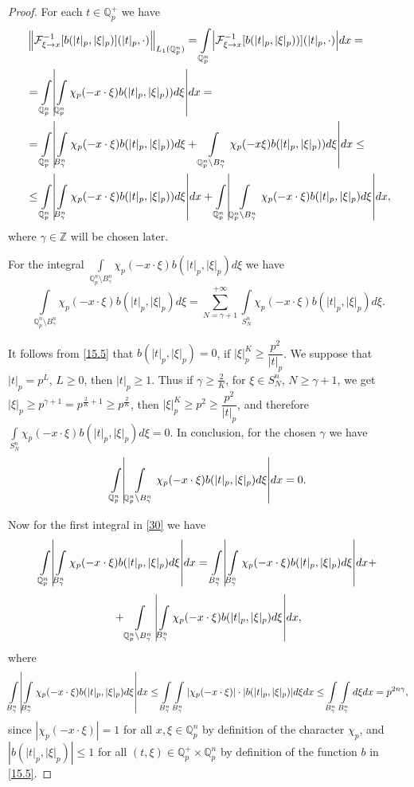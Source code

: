 \documentclass[14pt]{article}
\DeclarePairedDelimiter\abs{\lvert}{\rvert}
\newcommand{\norm}[1]{\left\lVert#1\right\rVert}
\theoremstyle{theorem}
\theoremstyle{theorem}
\theoremstyle{definition}
\theoremstyle{lemma}
\newcommand{\Label}[1]{\label{#1}}
\numberwithin{equation}{section}
\begin{document}
\begin{proof}
For each $t\in\mathbb{Q}_p^+$ we have
\begin{equation}\Label{30}
\begin{split}
&\norm{\mathcal{F}_{\xi\to x}^{-1}[b(|t|_p,|\xi|_p)](|t|_p,\cdot)}_{L_1(\mathbb{Q}_p^n)}=\int\limits_{\mathbb{Q}_p^n}\abs*{\mathcal{F}_{\xi\to x}^{-1}[b(|t|_p,|\xi|_p))](|t|_p,\cdot)}dx=\\
&=\int\limits_{\mathbb{Q}_p^n}\abs*{\int\limits_{\mathbb{Q}_p^n}\chi_p(-x\cdot\xi)b(|t|_p,|\xi|_p))d\xi}dx=\\
&=\int\limits_{\mathbb{Q}_p^n}\abs*{\int\limits_{B_{\gamma}^n}\chi_p(-x\cdot\xi)b(|t|_p,|\xi|_p))d\xi+\int\limits_{\mathbb{Q}_p^n\setminus B_{\gamma}^n}\chi_p(-x\xi)b(|t|_p,|\xi|_p))d\xi}dx\leq\\
&\leq\int\limits_{\mathbb{Q}_p^n}\abs*{\int\limits_{B_{\gamma}^n}\chi_p(-x\cdot\xi)b(|t|_p,|\xi|_p))d\xi}dx+\int\limits_{\mathbb{Q}_p^n}\abs*{\int\limits_{\mathbb{Q}_p^n\setminus B_{\gamma}^n}\chi_p(-x\cdot\xi)b(|t|_p,|\xi|_p)d\xi}dx,
\end{split}
\end{equation}
where $\gamma\in\mathbb{Z}$ will be chosen later.

For the integral $\int\limits_{\mathbb{Q}_p^n\setminus B_{\gamma}^n}\chi_p(-x\cdot\xi)b(|t|_p,|\xi|_p)d\xi$ we have
$$\int\limits_{\mathbb{Q}_p^n\setminus B_{\gamma}^n}\chi_p(-x\cdot\xi)b(|t|_p,|\xi|_p)d\xi=\sum\limits_{N=\gamma+1}^{+\infty}\int\limits_{S_N^n}\chi_p(-x\cdot\xi)b(|t|_p,|\xi|_p)d\xi.$$

It follows from \eqref{15.5} that $b(|t|_p,|\xi|_p)=0$, if $|\xi|_p^K\geq\dfrac{p^2}{|t|_p}$. We suppose that $|t|_p=p^L$, $L\geq0$, then $|t|_p\geq1$. Thus if $\gamma\geq\frac{2}{K}$, for $\xi\in S_N^n$, $N\geq\gamma+1$, we get $|\xi|_p\geq p^{\gamma+1}=p^{\frac{2}{K}+1}\geq p^{\frac{2}{K}}$, then $|\xi|_p^K\geq p^2\geq\dfrac{p^2}{|t|_p}$, and therefore $\int\limits_{S_N^n}\chi_p(-x\cdot\xi)b(|t|_p,|\xi|_p)d\xi=0$. In conclusion, for the chosen $\gamma$ we have
$$\int\limits_{\mathbb{Q}_p^n}\abs*{\int\limits_{\mathbb{Q}_p^n\setminus B_{\gamma}^n}\chi_p(-x\cdot\xi)b(|t|_p,|\xi|_p)d\xi}dx=0.$$

Now for the first integral in \eqref{30} we have
$$\int\limits_{\mathbb{Q}_p^n}\abs*{\int\limits_{B_{\gamma}^n}\chi_p(-x\cdot\xi)b(|t|_p,|\xi|_p)d\xi}dx=\int\limits_{B_{\gamma}^n}\abs*{\int\limits_{B_{\gamma}^n}\chi_p(-x\cdot\xi)b(|t|_p,|\xi|_p)d\xi}dx+$$
$$+\int\limits_{\mathbb{Q}_p^n\setminus B_{\gamma}^n}\abs*{\int\limits_{B_{\gamma}^n}\chi_p(-x\cdot\xi)b(|t|_p,|\xi|_p)d\xi}dx,$$
where
$$\int\limits_{B_{\gamma}^n}\abs*{\int\limits_{B_{\gamma}^n}\chi_p(-x\cdot\xi)b(|t|_p,|\xi|_p)d\xi}dx\leq\int\limits_{B_{\gamma}^n}\int\limits_{B_{\gamma}^n}|\chi_p(-x\cdot\xi)|\cdot|b(|t|_p,|\xi|_p)|d\xi dx\leq\int\limits_{B_{\gamma}^n}\int\limits_{B_{\gamma}^n}d\xi dx=p^{2n\gamma},$$
since
$|\chi_p(-x\cdot\xi)|=1$ for all $x,\xi\in\mathbb{Q}_p^n$ by definition of the character $\chi_p$, and $|b(|t|_p,|\xi|_p)|\leq1$ for all $(t,\xi)\in\mathbb{Q}_p^+\times\mathbb{Q}_p^n$ by definition of the function $b$ in \eqref{15.5}.


\end{proof}
\end{document}
